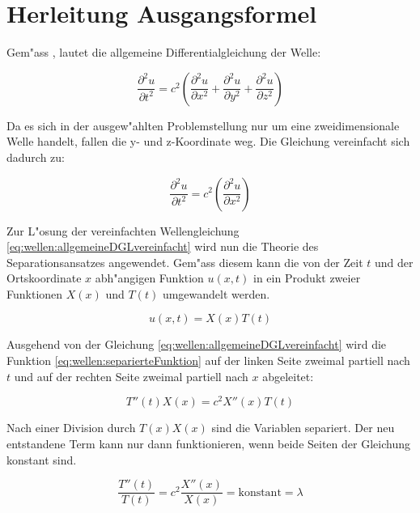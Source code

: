 \section{Herleitung Ausgangsformel}
Gem"ass \cite{wellen:smirnow2}, lautet die allgemeine Differentialgleichung der 
Welle:

\begin{equation*}
	\frac{\partial^2 u}{\partial t^2}
	=
	c^2
	\left(
		\frac{\partial^2 u}{\partial x^2} 
		+ \frac{\partial^2 u}{\partial y^2} 
		+ \frac{\partial^2 u}{\partial z^2}
	\right)
	\label{eq:wellen:allgemeineDGL}
\end{equation*}

Da es sich in der ausgew"ahlten Problemstellung nur um eine zweidimensionale 
Welle handelt, fallen die y- und z-Koordinate weg. Die Gleichung vereinfacht 
sich dadurch zu:

\begin{equation}
	\frac{\partial^2 u}{\partial t^2}
	=
	c^2
	\left(
		\frac{\partial^2 u}{\partial x^2} 
	\right)
	\label{eq:wellen:allgemeineDGLvereinfacht}
\end{equation}

Zur L"osung der vereinfachten Wellengleichung 
\ref{eq:wellen:allgemeineDGLvereinfacht} wird nun die Theorie des 
Separationsansatzes angewendet. Gem"ass diesem kann die von der Zeit $t$ und 
der Ortskoordinate $x$ abh"angigen Funktion $u(x,t)$ in ein Produkt 
zweier Funktionen $X(x)$ und $T(t)$ umgewandelt werden.

\begin{equation}
	u (x,t) = X(x) T(t)
	\label{eq:wellen:separierteFunktion}
\end{equation}

Ausgehend von der Gleichung \ref{eq:wellen:allgemeineDGLvereinfacht} wird die 
Funktion \ref{eq:wellen:separierteFunktion} auf der linken Seite zweimal 
partiell nach $t$ und auf der rechten Seite zweimal partiell nach $x$ 
abgeleitet:

\begin{equation*}
	T''(t) X(x) = c^2 X''(x)T(t)
\end{equation*}

Nach einer Division durch $T(x)X(x)$ sind die Variablen separiert. Der neu 
entstandene Term kann nur dann funktionieren, wenn beide Seiten der Gleichung 
konstant sind.

\begin{equation*}
	\frac{T''(t)}{T(t)}
	=
	c^2 \frac{X''(x)}{X(x)} = \text{konstant} = \lambda
\end{equation*}

